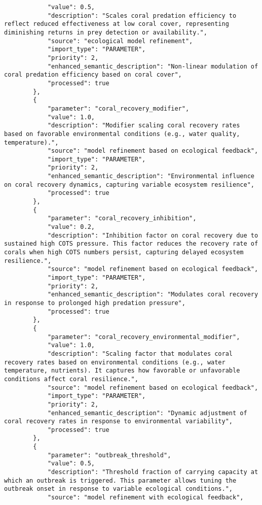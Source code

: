 \begin{lstlisting}
            "value": 0.5,
            "description": "Scales coral predation efficiency to reflect reduced effectiveness at low coral cover, representing diminishing returns in prey detection or availability.",
            "source": "ecological model refinement",
            "import_type": "PARAMETER",
            "priority": 2,
            "enhanced_semantic_description": "Non-linear modulation of coral predation efficiency based on coral cover",
            "processed": true
        },
        {
            "parameter": "coral_recovery_modifier",
            "value": 1.0,
            "description": "Modifier scaling coral recovery rates based on favorable environmental conditions (e.g., water quality, temperature).",
            "source": "model refinement based on ecological feedback",
            "import_type": "PARAMETER",
            "priority": 2,
            "enhanced_semantic_description": "Environmental influence on coral recovery dynamics, capturing variable ecosystem resilience",
            "processed": true
        },
        {
            "parameter": "coral_recovery_inhibition",
            "value": 0.2,
            "description": "Inhibition factor on coral recovery due to sustained high COTS pressure. This factor reduces the recovery rate of corals when high COTS numbers persist, capturing delayed ecosystem resilience.",
            "source": "model refinement based on ecological feedback",
            "import_type": "PARAMETER",
            "priority": 2,
            "enhanced_semantic_description": "Modulates coral recovery in response to prolonged high predation pressure",
            "processed": true
        },
        {
            "parameter": "coral_recovery_environmental_modifier",
            "value": 1.0,
            "description": "Scaling factor that modulates coral recovery rates based on environmental conditions (e.g., water temperature, nutrients). It captures how favorable or unfavorable conditions affect coral resilience.",
            "source": "model refinement based on ecological feedback",
            "import_type": "PARAMETER",
            "priority": 2,
            "enhanced_semantic_description": "Dynamic adjustment of coral recovery rates in response to environmental variability",
            "processed": true
        },
        {
            "parameter": "outbreak_threshold",
            "value": 0.5,
            "description": "Threshold fraction of carrying capacity at which an outbreak is triggered. This parameter allows tuning the outbreak onset in response to variable ecological conditions.",
            "source": "model refinement with ecological feedback",

\end{lstlisting}
